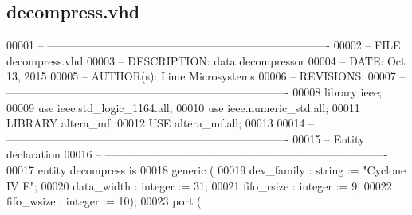 \subsection{decompress.\+vhd}
\label{decompress_8vhd_source}

\begin{DoxyCode}
00001 \textcolor{keyword}{-- ---------------------------------------------------------------------------- }
00002 \textcolor{keyword}{-- FILE:    decompress.vhd}
00003 \textcolor{keyword}{-- DESCRIPTION: data decompressor}
00004 \textcolor{keyword}{-- DATE:    Oct 13, 2015}
00005 \textcolor{keyword}{-- AUTHOR(s):   Lime Microsystems}
00006 \textcolor{keyword}{-- REVISIONS:}
00007 \textcolor{keyword}{-- ---------------------------------------------------------------------------- }
00008 \textcolor{vhdlkeyword}{library }\textcolor{keywordflow}{ieee};
00009 \textcolor{vhdlkeyword}{use }ieee.std\_logic\_1164.\textcolor{keywordflow}{all};
00010 \textcolor{vhdlkeyword}{use }ieee.numeric\_std.\textcolor{keywordflow}{all};
00011 \textcolor{vhdlkeyword}{LIBRARY }\textcolor{keywordflow}{altera\_mf};
00012 \textcolor{vhdlkeyword}{USE }\textcolor{keywordflow}{altera\_mf.all};
00013 
00014 \textcolor{keyword}{-- ----------------------------------------------------------------------------}
00015 \textcolor{keyword}{-- Entity declaration}
00016 \textcolor{keyword}{-- ----------------------------------------------------------------------------}
00017 \textcolor{keywordflow}{entity }decompress \textcolor{keywordflow}{is}
00018   \textcolor{keywordflow}{generic} \textcolor{vhdlchar}{(}
00019                 \textcolor{vhdlchar}{dev_family}  \textcolor{vhdlchar}{:} \textcolor{comment}{string}  \textcolor{vhdlchar}{:=} \textcolor{keyword}{"Cyclone IV E"};
00020                 \textcolor{vhdlchar}{data_width}  \textcolor{vhdlchar}{:} \textcolor{comment}{integer} \textcolor{vhdlchar}{:=} \textcolor{vhdllogic}{}\textcolor{vhdllogic}{31};
00021                 \textcolor{vhdlchar}{fifo_rsize}  \textcolor{vhdlchar}{:} \textcolor{comment}{integer} \textcolor{vhdlchar}{:=} \textcolor{vhdllogic}{}\textcolor{vhdllogic}{9};
00022                 \textcolor{vhdlchar}{fifo_wsize}  \textcolor{vhdlchar}{:} \textcolor{comment}{integer} \textcolor{vhdlchar}{:=} \textcolor{vhdllogic}{}\textcolor{vhdllogic}{10}\textcolor{vhdlchar}{)};
00023   \textcolor{keywordflow}{port} \textcolor{vhdlchar}{(}

\end{DoxyCode}
